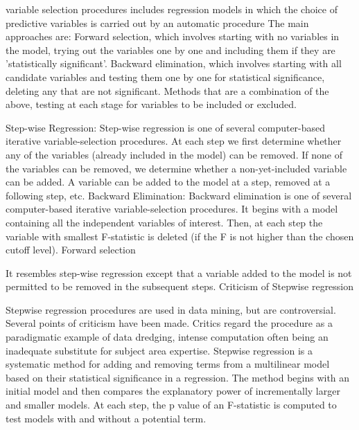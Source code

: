 
variable selection procedures includes regression models in which the choice of predictive variables is carried out by an automatic procedure
The main approaches are:
Forward selection, which involves starting with no variables in the model, trying out the variables one by one and including them if they are 'statistically significant'.
Backward elimination, which involves starting with all candidate variables and testing them one by one for statistical significance, deleting any that are not significant.
Methods that are a combination of the above, testing at each stage for variables to be included or excluded.

Step-wise Regression:
Step-wise regression is one of several computer-based iterative variable-selection procedures. At each step we first determine whether any of the variables (already included in the model) can be removed. If none of the variables can be removed, we determine whether a non-yet-included variable can be added. A variable can be added to the model at a step, removed at a following step, etc.
Backward Elimination:
Backward elimination is one of several computer-based iterative variable-selection procedures. It begins with a model containing all the independent variables of interest. Then, at each step the variable with smallest F-statistic is deleted (if the F is not higher than the chosen cutoff level).
Forward selection 

It resembles step-wise regression except that a variable added to the model is not permitted to be removed in the subsequent steps.
Criticism of Stepwise regression

Stepwise regression procedures are used in data mining, but are controversial. Several points of criticism have been made.
Critics regard the procedure as a paradigmatic example of data dredging, intense computation often being an inadequate substitute for subject area expertise.
Stepwise regression is a systematic method for adding and removing terms from a multilinear model based on their statistical significance in a regression. The method begins with an initial model and then compares the explanatory power of incrementally larger and smaller models. At each step, the p value of an F-statistic is computed to test models with and without a potential term. 

